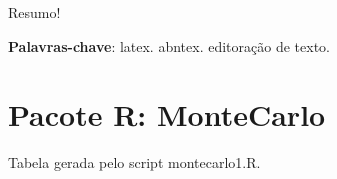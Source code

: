 \documentclass[
	article,			%
	11pt,				%
	oneside,			%
	a4paper,			%
	english,			%
	brazil,				%
	sumario=tradicional
	]{abntex2}
\begin{document}

\frenchspacing 


%
%
\maketitle

\begin{resumoumacoluna}

 Resumo!
 
 \vspace{\onelineskip}
 
 \noindent
 \textbf{Palavras-chave}: latex. abntex. editoração de texto.
\end{resumoumacoluna}


\textual

\section*{Pacote R: MonteCarlo}

Tabela gerada pelo script montecarlo1.R.
\end{document}
